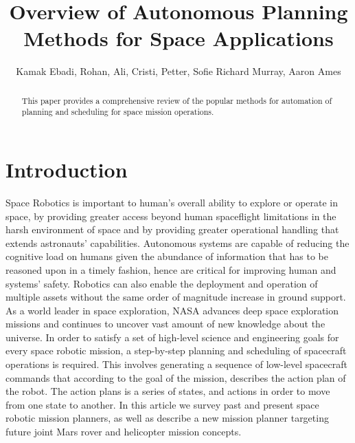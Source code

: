 \documentclass[conference]{IEEEtran}
\begin{document}

\title{\huge Overview of Autonomous Planning Methods for Space Applications}

\author{Kamak Ebadi, Rohan, Ali, Cristi, Petter, Sofie Richard Murray, Aaron Ames}

\maketitle

\begin{abstract}
This paper provides a comprehensive review of the popular methods for automation of planning and scheduling for space mission operations.
\end{abstract}

\section{Introduction}
Space Robotics is important to human’s overall ability to explore or operate in space, by providing greater access beyond human spaceflight limitations in the harsh environment of space and by providing greater operational handling that extends astronauts’ capabilities. Autonomous systems are capable of reducing the cognitive load on humans given the abundance of information that has to be reasoned upon in a timely fashion, hence are critical for improving human and systems’ safety. Robotics can also enable the deployment and operation of multiple assets without the same order of magnitude increase in ground support.
As a world leader in space exploration, NASA advances deep space exploration missions and continues to uncover vast amount of new knowledge about the universe.
In order to satisfy a set of high-level science and engineering goals for every space robotic mission, a step-by-step planning and scheduling of spacecraft operations is required. This involves generating a sequence of low-level spacecraft commands that according to the goal of the mission, describes the action plan of the robot. The action plans is a series of states, and actions in order to move from one state to another.
In this article we survey past and present space robotic mission planners, as well as describe a new mission planner targeting future joint Mars rover and helicopter mission concepts.
\end{document}
